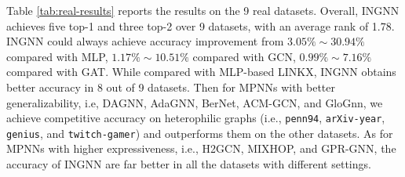 \documentclass{article}
\theoremstyle{plain}
\newcommand{\pjn}{{INGNN}}
\begin{document}
Table \ref{tab:real-results} reports the results on the 9 real datasets. Overall, \pjn{} achieves five top-1 and three top-2 over 9 datasets, with an average rank of 1.78.
\pjn{} could always achieve accuracy improvement from $3.05\% \sim 30.94\%$ compared with MLP, $1.17\% \sim 10.51\%$ compared with GCN, $0.99\% \sim 7.16\%$ compared with GAT. While compared with MLP-based LINKX, \pjn{} obtains better accuracy in 8 out of 9 datasets.
Then for MPNNs with better generalizability, i.e, DAGNN, AdaGNN, BerNet, ACM-GCN, and GloGnn, we achieve competitive accuracy on heterophilic graphs (i.e., \texttt{penn94}, \texttt{arXiv-year}, \texttt{genius}, and \texttt{twitch-gamer}) and outperforms them on the other datasets.
As for MPNNs with higher expressiveness, i.e., H2GCN, MIXHOP, and GPR-GNN, the accuracy of \pjn{} are far better in all the datasets with different settings.
\end{document}
